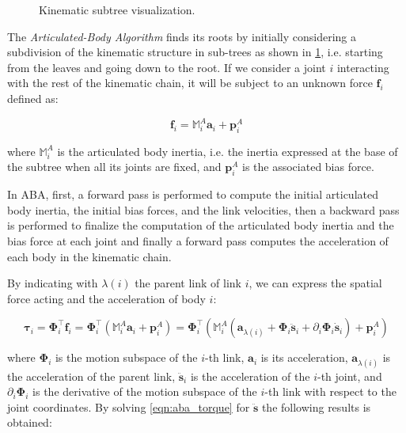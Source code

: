 \begin{figure}[h]
    \centering
    \caption{Kinematic subtree visualization.}
    \label{fig:kin_tree}
\end{figure}

The \textit{Articulated-Body Algorithm} \citep{featherstone_rigid_2008} finds its roots by initially considering a subdivision of the kinematic structure in sub-trees as shown in \cref{fig:kin_tree}, i.e. starting from the leaves and going down to the root. If we consider a joint $i$ interacting with the rest of the kinematic chain, it will be subject to an unknown force $\mathbf{f} _i$ defined as:

\begin{equation}
    \label{eqn:biasforce}
    \mathbf{f} _i = \mathbb{M} _i ^A \mathbf{a} _i + \mathbf{p} ^A _i
\end{equation}

where $\mathbb{M} _i ^A$ is the articulated body inertia, i.e. the inertia expressed at the base of the subtree when all its joints are fixed, and $\mathbf{p} ^A _i$ is the associated bias force.

In ABA, first, a forward pass is performed to compute the initial articulated body inertia, the initial bias forces, and the link velocities, then a backward pass is performed to finalize the computation of the articulated body inertia and the bias force at each joint and finally a forward pass computes the acceleration of each body in the kinematic chain.

By indicating with $\lambda(i)$ the parent link of link $i$, we can express the spatial force acting and the acceleration of body $i$:

\begin{equation}
    \label{eqn:aba_torque}
    \boldsymbol{\tau} _i = \boldsymbol{\Phi} ^\top _i \mathbf{f} _i = \boldsymbol{\Phi} ^\top _i (\mathbb{M} _i ^A \mathbf{a} _i + \mathbf{p} ^A _i) = \boldsymbol{\Phi} ^\top _i (\mathbb{M} _i ^A (\mathbf{a} _{\lambda(i)} + \boldsymbol{\Phi} _i \ddot{\mathbf{s}} _i + \partial_i \boldsymbol{\Phi} _i \dot{\mathbf{s}} _i)+ \mathbf{p} ^A _i)
\end{equation}

where $\boldsymbol{\Phi} _i$ is the motion subspace of the $i$-th link, $\mathbf{a} _i$ is its acceleration, $\mathbf{a} _{\lambda(i)}$ is the acceleration of the parent link, $\ddot{\mathbf{s}} _i$ is the acceleration of the $i$-th joint, and $\partial_i \boldsymbol{\Phi} _i$ is the derivative of the motion subspace of the $i$-th link with respect to the joint coordinates.
By solving \cref{eqn:aba_torque} for $\ddot{\mathbf{s}}$ the following results is obtained:

